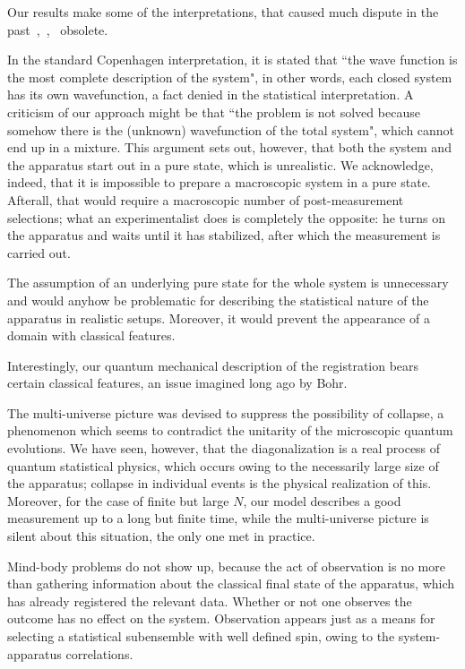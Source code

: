 \documentclass[12pt, onecolumn, aps,prb,floatfix]{revtex4-2}
\begin{document}
Our results make some of the interpretations, that caused much dispute in
the past~\cite{wh},~\cite{Vaxjo},~\cite{Schlosshauer} obsolete. 


In the standard Copenhagen interpretation, it is stated that ``the wave function
is the most complete description of the system", in other words, each closed 
system has its own wavefunction, a fact denied in the statistical interpretation. 
A criticism of our approach might be that 
``the problem is not solved because somehow there is the (unknown) wavefunction
of the total system", which cannot end up in a mixture.
This argument sets out, however, that both the system and the apparatus start
out in a pure state, which is unrealistic. We acknowledge, indeed, that it is 
impossible to prepare a macroscopic system in a pure state. 
Afterall, that would require a macroscopic number of post-measurement selections; 
what an experimentalist does is completely the opposite: 
he turns on the apparatus and waits until it has stabilized, after
which the measurement is carried out.  

The assumption of an underlying pure state for the whole system is 
unnecessary and would anyhow be problematic for describing 
the statistical nature of the apparatus in realistic setups.
Moreover, it would prevent the appearance of a domain with classical features.
 
Interestingly, our quantum mechanical description of the registration 
bears certain classical features, an issue imagined long ago by Bohr.


The multi-universe picture was devised to suppress the possibility of collapse, 
a phenomenon which seems to contradict the unitarity of the microscopic quantum
evolutions. We have seen, however, that the  diagonalization is a real process of 
quantum statistical physics, which occurs owing to the necessarily large size 
of the apparatus; collapse in individual events is the physical realization 
of this. Moreover, for the case of finite but large $N$, 
our model describes a good measurement up to a long but finite time, while the 
multi-universe picture is silent about this situation, the only one met in
practice.

Mind-body problems do not show up, because the act of observation is no more
than gathering information about the classical final state of the apparatus, 
which has already registered the relevant data. 
Whether or not one observes the outcome has no effect on the system. 
Observation appears just as a means for selecting a statistical subensemble 
with well defined spin, owing to the system-apparatus correlations. 
\end{document}

